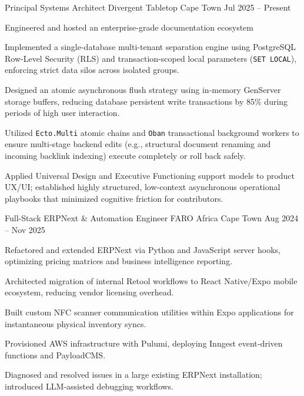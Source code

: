 
\begin{cventries}

  \cventry
  {Principal Systems Architect}
  {Divergent Tabletop}
  {Cape Town}
  {Jul 2025 -- Present}
  {
    \begin{cvitems}
      \item Engineered and hosted an enterprise-grade documentation ecosystem
      \item Implemented a single-database multi-tenant separation engine using PostgreSQL Row-Level Security (RLS) and transaction-scoped local parameters (\texttt{SET LOCAL}), enforcing strict data silos across isolated groups.
      \item Designed an atomic asynchronous flush strategy using in-memory GenServer storage buffers, reducing database persistent write transactions by 85\% during periods of high user interaction.
      \item Utilized \texttt{Ecto.Multi} atomic chains and \texttt{Oban} transactional background workers to ensure multi-stage backend edits (e.g., structural document renaming and incoming backlink indexing) execute completely or roll back safely.
      \item Applied Universal Design and Executive Functioning support models to product UX/UI; established highly structured, low-context asynchronous operational playbooks that minimized cognitive friction for contributors.
    \end{cvitems}
  }

  \cventry
  {Full-Stack ERPNext \& Automation Engineer}
  {FARO Africa}
  {Cape Town}
  {Aug 2024 -- Nov 2025}
  {
    \begin{cvitems}
      \item Refactored and extended ERPNext via Python and JavaScript server hooks, optimizing pricing matrices and business intelligence reporting.
      \item Architected migration of internal Retool workflows to React Native/Expo mobile ecosystem, reducing vendor licensing overhead.
      \item Built custom NFC scanner communication utilities within Expo applications for instantaneous physical inventory syncs.
      \item Provisioned AWS infrastructure with Pulumi, deploying Inngest event-driven functions and PayloadCMS.
      \item Diagnosed and resolved issues in a large existing ERPNext installation; introduced LLM-assisted debugging workflows.
    \end{cvitems}
  }


\end{cventries}

